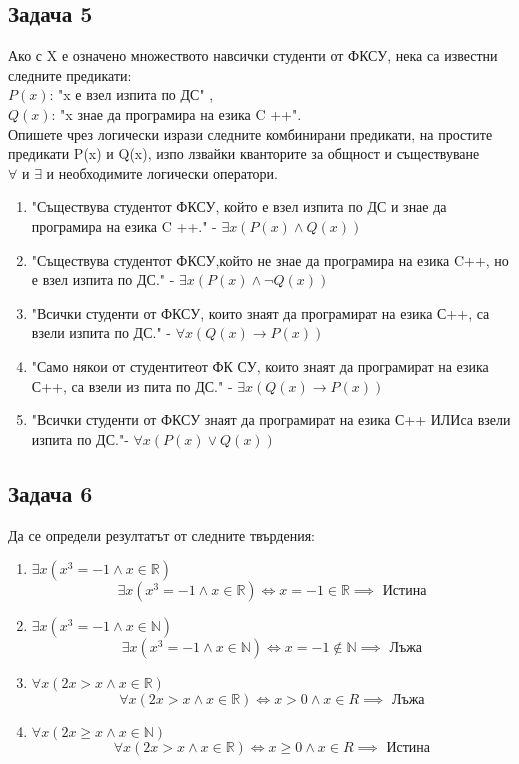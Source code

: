 \documentclass[fleqn, 12pt]{article}
\theoremstyle{definition}
\begin{document}
\subsection*{Задача 5}
Ако с X е означено множеството навсички студенти от ФКСУ, нека са известни следните предикати:\\
$P(x)$: "x е взел изпита по ДС" , \\
$Q(x)$: "x знае да програмира на езика C ++".   \\
Опишете  чрез  логически  изрази  следните  комбинирани  предикати,  на  простите предикати  P(x) и   Q(x), изпо лзвайки кванторите за общност и съществуване  $\forall \text{ и } \exists$ и необходимите логически оператори. 
\begin{enumerate}
\item "Съществува студентот ФКСУ, който е взел изпита по ДС и знае  да програмира на езика C ++." - 
$\exists x(P(x) \land Q(x))$
\item "Съществува студентот ФКСУ,който не знае да програмира на езика C++, но е взел изпита по ДС." - 
$\exists x(P(x) \land \neg Q(x))$
\item "Всички студенти от ФКСУ, които знаят да програмират на езика С++, са взели изпита по ДС."  - 
$\forall x(Q(x) \to P(x))$
\item "Само някои от студентитеот ФК СУ, които знаят да програмират на езика С++, са взели из   пита по ДС." - 
$\exists x(Q(x) \to P(x))$
\item "Всички студенти от ФКСУ знаят да програмират на езика С++ ИЛИса взели изпита по ДС."-
$\forall x(P(x) \lor Q(x))$
\end{enumerate}

\subsection*{Задача 6}
Да се определи резултатът от следните твърдения: 
\begin{enumerate}
\item $\exists x(x^3 = -1 \land x \in \mathbb{R})$
$$\exists x(x^3 = -1 \land x \in \mathbb{R}) \Leftrightarrow x = -1 \in \mathbb{R} \implies \text{ Истина}$$  
\item $\exists x(x^3 = -1 \land x \in \mathbb{N})$
$$\exists x(x^3 = -1 \land x \in \mathbb{N}) \Leftrightarrow x = -1 \notin \mathbb{N} \implies \text{ Лъжа}$$  
\item $\forall x(2x > x \land x \in \mathbb{R})$
$$\forall x(2x > x \land x \in \mathbb{R}) \Leftrightarrow x>0 \land x \in R \implies \text{ Лъжа} $$  
\item $\forall x(2x \geq x \land x \in \mathbb{N})$
$$\forall x(2x > x \land x \in \mathbb{R}) \Leftrightarrow x \geq 0 \land x \in R \implies \text{ Истина} $$  
\end{enumerate}
\newpage
\end{document}
